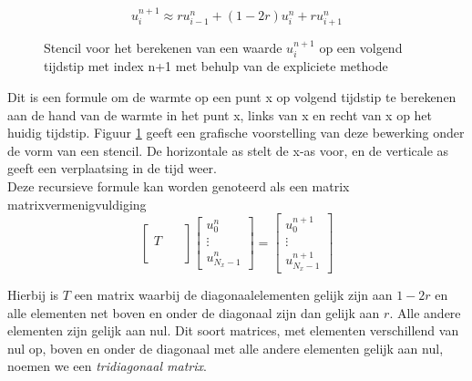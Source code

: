 \documentclass[a4paper,kulak]{kulakarticle} %
\newcommand{\stencilpt}[4][]{\node[circle,fill,draw,inner sep=1.5pt,label={above left:#4},#1] at (#2) (#3) {}}
\begin{document}
\begin{equation}
	u_i^{n+1} \approx r u_{i-1}^n + \left( 1 - 2r \right) u_i^n + r u_{i+1}^n 
	\label{eq:expl_recursive}
\end{equation}

\begin{figure}
\centering
{}
\caption{Stencil voor het berekenen van een waarde $u_i^{n+1}$ op een volgend tijdstip met index n+1 met behulp van de expliciete methode}
\label{fig:stencil_explicit}
\end{figure}

Dit is een formule om de warmte op een punt x op volgend tijdstip te berekenen aan de hand van de warmte in het punt x, links van x en recht van x op het huidig tijdstip. Figuur \ref{fig:stencil_explicit} geeft een grafische voorstelling van deze bewerking onder de vorm van een stencil. De horizontale as stelt de x-as voor, en de verticale as geeft een verplaatsing in de tijd weer. \\
Deze recursieve formule kan worden genoteerd als een matrix matrixvermenigvuldiging
\begin{equation}
	\begin{bmatrix}
		\qquad \\
		T \\
		\\ 
	\end{bmatrix}
	\begin{bmatrix}
		u_0^n \\
		\vdots \\
		u_{N_x - 1}^n
	\end{bmatrix}
	=
	\begin{bmatrix}
		u_0^{n+1} \\
		\vdots \\
		u_{N_x - 1}^{n+1}
	\end{bmatrix}	
\end{equation}

Hierbij is $T$ een matrix waarbij de diagonaalelementen gelijk zijn aan $1-2r$ en alle elementen net boven en onder de diagonaal zijn dan gelijk aan $r$. Alle andere elementen zijn gelijk aan nul. Dit soort matrices, met elementen verschillend van nul op, boven en onder de diagonaal met alle andere elementen gelijk aan nul, noemen we een \textit{tridiagonaal matrix}.
\end{document}
